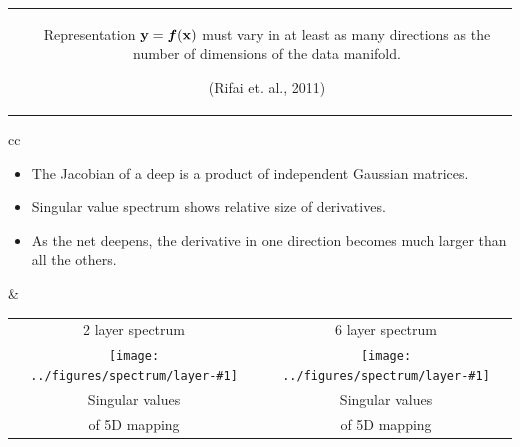 \documentclass[portrait,a0b,final,a4resizeable]{include/a0poster}
\def\jointspacing{\vspace{0.3in}}
\newcommand{\spectrumpic}[1]{
\texttt{[image: ../figures/spectrum/layer-\#1]}}
\begin{document}
\begin{poster}
\begin{multicols}{2}
\begin{tabular}{cc}
\begin{minipage}[c]{0.45\columnwidth}
\end{minipage}
&
\begin{minipage}[c]{0.5\columnwidth}
Representation $\mathbf{y} = \boldsymbol{f}(\mathbf{x})$ must vary in at least as many directions as the number of dimensions of the data manifold.

{\color{mydarkblue} (Rifai et. al., 2011)}
\end{minipage}
\end{tabular}

\jointspacing










\begin{tabular}{cc}
\begin{minipage}[c]{0.4\columnwidth}

\begin{itemize}
\item The Jacobian of a deep \gp{} is a product of independent Gaussian matrices.
\item Singular value spectrum shows relative size of derivatives.
\item As the net deepens, the derivative in one direction becomes much larger than all the others.
\end{itemize}

\end{minipage}
&
\begin{minipage}[c]{0.55\columnwidth}
\begin{centering}
\begin{tabular}{cc}
2 layer spectrum & 6 layer spectrum \\
\hspace{-0.16in} \spectrumpic{2} &
\hspace{-0.16in} \spectrumpic{6} \\
Singular values & Singular values \\
of 5D mapping & of 5D mapping
\end{tabular}
\end{centering}
\end{minipage}
\end{tabular}







\end{multicols}
\end{poster}
\end{document}
